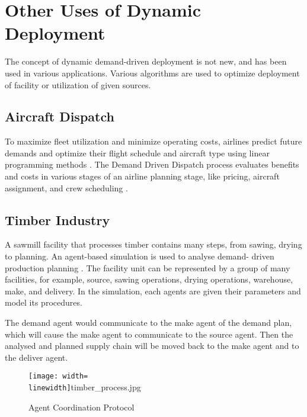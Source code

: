 \section{Other Uses of Dynamic Deployment}
The concept of dynamic demand-driven deployment is not new,
and has been used in various applications. Various algorithms
are used to optimize deployment of facility or utilization
of given sources.

\subsection{Aircraft Dispatch}
To maximize fleet utilization and minimize
operating costs, airlines predict future demands
and optimize their flight schedule and aircraft
type using linear programming methods \cite{berge_demand_1993}. The Demand
Driven Dispatch process evaluates benefits and costs
in various stages of an airline planning stage, like
pricing, aircraft assignment, and crew scheduling \cite{shebalov_practical_2009}.

\subsection{Timber Industry}
A sawmill facility that processes timber contains 
many steps, from sawing, drying to planning. An
agent-based simulation is used to analyse demand-
driven production planning \cite{yáñez_agent-based_2009}.
The facility unit can be represented by a group of many facilities,
for example, source, sawing operations, drying operations, warehouse,
make, and delivery. In the simulation, each agents are given their parameters
and model its procedures.

The demand agent would communicate to the make agent of the demand plan,
which will cause the make agent to communicate to the source agent. Then the
analysed and planned supply chain will be moved back to the make agent and
to the deliver agent.

\begin{figure}
	\texttt{[image: width=\\linewidth]}{timber_process.jpg}
	\caption{Agent Coordination Protocol}
	\label{fig:timber_process}
	\cite{yáñez_agent-based_2009}
\end{figure}
